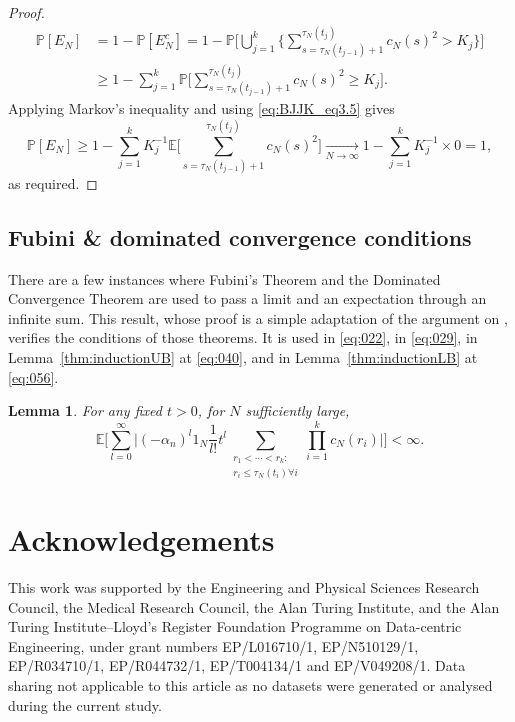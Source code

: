 \documentclass[12pt,authoryear]{article}
\newtheorem{lemma}{Lemma}
\theoremstyle{definition}
\newcommand{\Prob}{\mathbb{P}}
\newcommand{\E}{\mathbb{E}}
\newcommand{\1}[1]{\mathbbm{1}_{#1}}
\newcommand{\ON}{1_N}
\begin{document}
\begin{proof}
\begin{align*}
\Prob[E_N]
&= 1- \Prob[E_N^c]
= 1- \Prob\Bigg[ \bigcup_{j=1}^k \Bigg\{ \sum_{s=\tau_N(t_{j-1})+1}
        ^{\tau_N(t_j)} c_N(s)^2 > K_j \Bigg\} \Bigg] \\
&\geq 1- \sum_{j=1}^k \Prob\Bigg[ \sum_{s=\tau_N(t_{j-1})+1}
        ^{\tau_N(t_j)} c_N(s)^2 \geq K_j \Bigg] .
\end{align*}
Applying Markov's inequality and using \eqref{eq:BJJK_eq3.5} gives
\begin{equation*}
\Prob[E_N]
\geq 1- \sum_{j=1}^k K_j^{-1} \E\Bigg[ \sum_{s=\tau_N(t_{j-1})+1}
        ^{\tau_N(t_j)} c_N(s)^2 \Bigg]
\underset{N\to\infty}{\longrightarrow} 1- \sum_{j=1}^k K_j^{-1} \times 0 
= 1,
\end{equation*}
as required.
\end{proof}

\subsection{Fubini \& dominated convergence conditions}

There are a few instances where Fubini's Theorem and the Dominated Convergence Theorem are used to pass a limit and an expectation through an infinite sum.
This result, whose proof is a simple adaptation of the argument on \citet[Supplement, p.\ 33--34]{koskela2022erratum}, verifies the conditions of those theorems.
It is used in \eqref{eq:022}, in \eqref{eq:029}, in Lemma~\ref{thm:inductionUB} at \eqref{eq:040}, and in Lemma~\ref{thm:inductionLB} at \eqref{eq:056}.
\begin{lemma}\label{thm:DCT_Fubini}
For any fixed $t>0$, for $N$ sufficiently large,
\begin{equation*}
\E \Bigg[ \sum_{l=0}^\infty \Big| (-\alpha_n)^l \ON \frac{1}{l!} t^l 
        \sum_{\substack{r_1 < \cdots < r_k : \\ r_i \leq \tau_N(t_i) \forall i}}
        \prod_{i=1}^k c_N(r_i) \Big| \Bigg]
< \infty .
\end{equation*}
\end{lemma}

\section*{Acknowledgements}

This work was supported by the Engineering and Physical Sciences Research Council, the Medical Research Council, the Alan Turing Institute, and the Alan Turing Institute--Lloyd’s Register Foundation Programme on Data-centric Engineering, under grant numbers EP/L016710/1, EP/N510129/1, EP/R034710/1, EP/R044732/1, EP/T004134/1 and EP/V049208/1.
Data sharing not applicable to this article as no datasets were generated or analysed during the current study.

 

\end{document}
